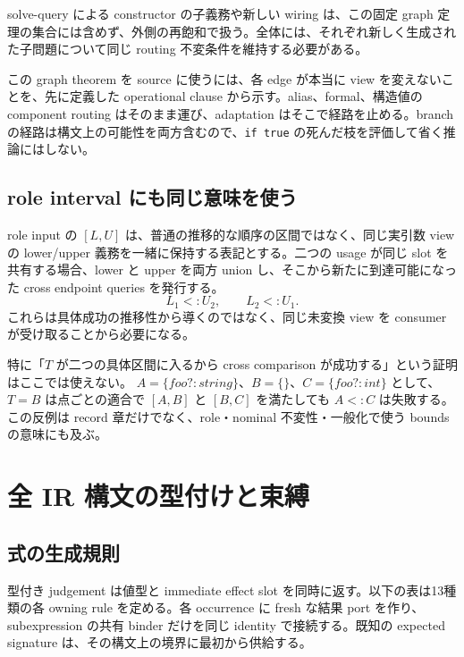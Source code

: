 \documentclass[11pt,a4paper]{article}
\theoremstyle{remark}
\begin{document}
solve-query による constructor の子義務や新しい wiring は、この固定 graph 定理の集合には含めず、外側の再飽和で扱う。全体には、それぞれ新しく生成された子問題について同じ routing 不変条件を維持する必要がある。

この graph theorem を source に使うには、各 edge が本当に view を変えないことを、先に定義した operational clause から示す。alias、formal、構造値の component routing はそのまま運び、adaptation はそこで経路を止める。branch の経路は構文上の可能性を両方含むので、\texttt{if true} の死んだ枝を評価して省く推論にはしない。

\subsection{role interval にも同じ意味を使う}

role input の $[L,U]$ は、普通の推移的な順序の区間ではなく、同じ実引数 view の lower/upper 義務を一緒に保持する表記とする。二つの usage が同じ slot を共有する場合、lower と upper を両方 union し、そこから新たに到達可能になった cross endpoint queries を発行する。
\[
L_1<:U_2,\qquad L_2<:U_1.
\]
これらは具体成功の推移性から導くのではなく、同じ未変換 view を consumer が受け取ることから必要になる。

特に「$T$ が二つの具体区間に入るから cross comparison が成功する」という証明はここでは使えない。
$A=\{foo?:string\}$、$B=\{\}$、$C=\{foo?:int\}$ として、$T=B$ は点ごとの適合で $[A,B]$ と $[B,C]$ を満たしても $A<:C$ は失敗する。この反例は record 章だけでなく、role・nominal 不変性・一般化で使う bounds の意味にも及ぶ。

\section{全 IR 構文の型付けと束縛}

\subsection{式の生成規則}

型付き judgement は値型と immediate effect slot を同時に返す。以下の表は13種類の各 owning rule を定める。各 occurrence に fresh な結果 port を作り、subexpression の共有 binder だけを同じ identity で接続する。既知の expected signature は、その構文上の境界に最初から供給する。
\end{document}

